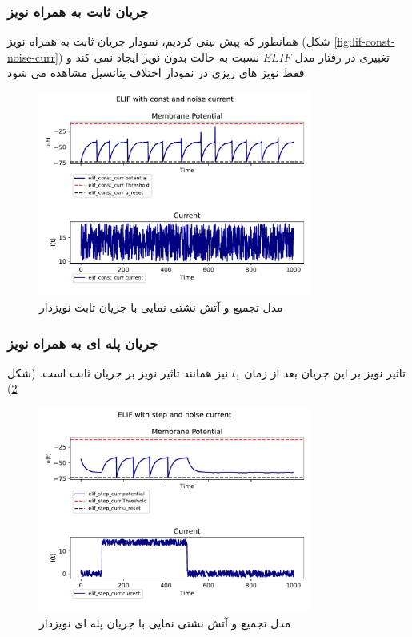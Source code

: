 \documentclass{article}
\begin{document}
            \subsubsection{جریان ثابت به همراه نویز}
                همانطور که پیش بینی کردیم، نمودار جریان ثابت به همراه نویز 
                (شکل \ref{fig:lif-const-noise-curr})
                تغییری در رفتار مدل 
                $ELIF$ 
                نسبت به حالت بدون نویز ایجاد نمی کند و فقط نویز های ریزی در نمودار اختلاف پتانسیل مشاهده می شود.
                \begin{figure}[H]
                    \centering
                    \includegraphics[width=0.8\textwidth]{plots/ELIF with const and noise current.pdf} 
                    \caption{مدل تجمیع و آتش نشتی نمایی با جریان ثابت نویزدار  }
                    \label{fig:elif-const-noise-curr}
                \end{figure}

            \subsubsection{جریان پله ای به همراه نویز}
                تاثیر نویز بر این جریان بعد از زمان
                $t_1$ 
                نیز همانند تاثیر نویز بر جریان ثابت است.
                (شکل \ref{fig:elif-step-noise-curr})

                \begin{figure}[H]
                    \centering
                    \includegraphics[width=0.8\textwidth]{plots/ELIF with step and noise current.pdf} 
                    \caption{مدل تجمیع و آتش نشتی نمایی با جریان پله ای نویزدار  }
                    \label{fig:elif-step-noise-curr}
                \end{figure}
\end{document}
